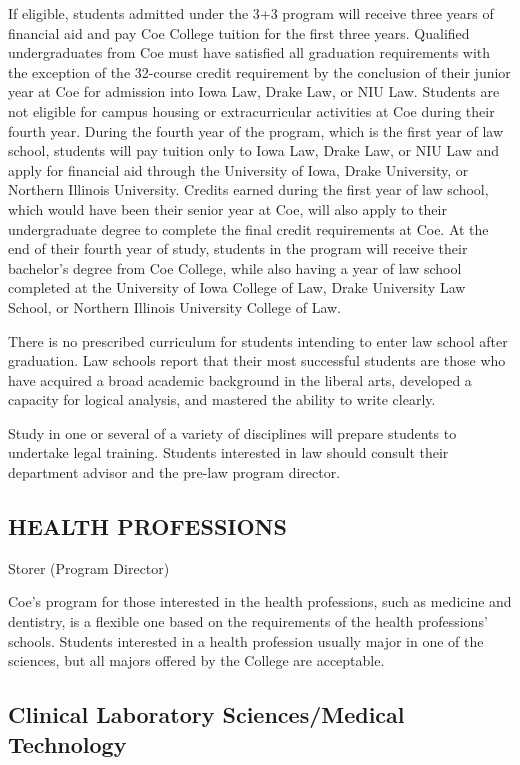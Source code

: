 \documentclass[
  letterpaper,
]{scrbook}
\begin{document}
If eligible, students admitted under the 3+3 program will receive three
years of financial aid and pay Coe College tuition for the first three
years. Qualified undergraduates from Coe must have satisfied all
graduation requirements with the exception of the 32-course credit
requirement by the conclusion of their junior year at Coe for admission
into Iowa Law, Drake Law, or NIU Law. Students are not eligible for
campus housing or extracurricular activities at Coe during their fourth
year. During the fourth year of the program, which is the first year of
law school, students will pay tuition only to Iowa Law, Drake Law, or
NIU Law and apply for financial aid through the University of Iowa,
Drake University, or Northern Illinois University. Credits earned during
the first year of law school, which would have been their senior year at
Coe, will also apply to their undergraduate degree to complete the final
credit requirements at Coe. At the end of their fourth year of study,
students in the program will receive their bachelor's degree from Coe
College, while also having a year of law school completed at the
University of Iowa College of Law, Drake University Law School, or
Northern Illinois University College of Law.

There is no prescribed curriculum for students intending to enter law
school after graduation. Law schools report that their most successful
students are those who have acquired a broad academic background in the
liberal arts, developed a capacity for logical analysis, and mastered
the ability to write clearly.

Study in one or several of a variety of disciplines will prepare
students to undertake legal training. Students interested in law should
consult their department advisor and the pre-law program director.

\subsection{HEALTH PROFESSIONS}\label{health-professions}

Storer (Program Director)

Coe's program for those interested in the health professions, such as
medicine and dentistry, is a flexible one based on the requirements of
the health professions' schools. Students interested in a health
profession usually major in one of the sciences, but all majors offered
by the College are acceptable.

\subsection{Clinical Laboratory Sciences/Medical
Technology}\label{clinical-laboratory-sciencesmedical-technology}
\end{document}
